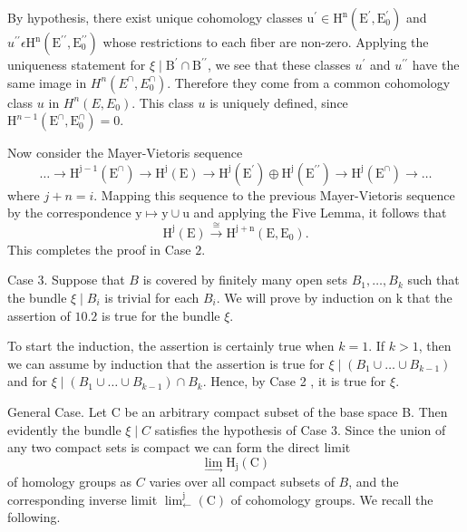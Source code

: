 \documentclass[10pt]{article}
\begin{document}
By hypothesis, there exist unique cohomology classes $\mathrm{u}^{\prime} \in \mathrm{H}^{\mathrm{n}}\left(\mathrm{E}^{\prime}, \mathrm{E}_{0}^{\prime}\right)$ and $u^{\prime \prime} \epsilon \mathrm{H}^{\mathrm{n}}\left(\mathrm{E}^{\prime \prime}, \mathrm{E}_{0}^{\prime \prime}\right)$ whose restrictions to each fiber are non-zero. Applying the uniqueness statement for $\xi \mid \mathrm{B}^{\prime} \cap \mathrm{B}^{\prime \prime}$, we see that these classes $u^{\prime}$ and $u^{\prime \prime}$ have the same image in $H^{n}\left(E^{\cap}, E_{0}^{\cap}\right)$. Therefore they come from a common cohomology class $u$ in $H^{n}\left(E, E_{0}\right)$. This class $u$ is uniquely defined, since $\mathrm{H}^{n-1}\left(\mathrm{E}^{\cap}, \mathrm{E}_{0}^{\cap}\right)=0$.

Now consider the Mayer-Vietoris sequence
$$
\ldots \rightarrow \mathrm{H}^{\mathrm{j}-1}\left(\mathrm{E}^{\cap}\right) \rightarrow \mathrm{H}^{\mathrm{j}}(\mathrm{E}) \rightarrow \mathrm{H}^{\mathrm{j}}\left(\mathrm{E}^{\prime}\right) \oplus \mathrm{H}^{\mathrm{j}}\left(\mathrm{E}^{\prime \prime}\right) \rightarrow \mathrm{H}^{\mathrm{j}}\left(\mathrm{E}^{\cap}\right) \rightarrow \ldots
$$
where $j+n=i$. Mapping this sequence to the previous Mayer-Vietoris sequence by the correspondence $\mathrm{y} \mapsto \mathrm{y} \cup \mathrm{u}$ and applying the Five Lemma, it follows that
$$
\mathrm{H}^{\mathrm{j}}(\mathrm{E}) \stackrel{\cong}{\longrightarrow} \mathrm{H}^{\mathrm{j}+\mathrm{n}}\left(\mathrm{E}, \mathrm{E}_{0}\right) .
$$
This completes the proof in Case $2 .$

Case 3. Suppose that $B$ is covered by finitely many open sets $B_{1}, \ldots, B_{k}$ such that the bundle $\xi \mid B_{i}$ is trivial for each $B_{i}$. We will prove by induction on $\mathrm{k}$ that the assertion of $10.2$ is true for the bundle $\xi$.

To start the induction, the assertion is certainly true when $k=1$. If $k>1$, then we can assume by induction that the assertion is true for $\xi \mid\left(B_{1} \cup \ldots \cup B_{k-1}\right)$ and for $\xi \mid\left(B_{1} \cup \ldots \cup B_{k-1}\right) \cap B_{k}$. Hence, by Case 2 , it is true for $\xi$.

General Case. Let $\mathrm{C}$ be an arbitrary compact subset of the base space B. Then evidently the bundle $\xi \mid C$ satisfies the hypothesis of Case 3. Since the union of any two compact sets is compact we can form the direct limit
$$
\lim _{\rightarrow} \mathrm{H}_{\mathrm{j}}(\mathrm{C})
$$
of homology groups as $C$ varies over all compact subsets of $B$, and the corresponding inverse limit $\lim _{\leftarrow}^{\mathrm{j}}(\mathrm{C})$ of cohomology groups. We recall the following.
\end{document}
